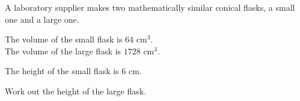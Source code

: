 \begin{question}
\noindent A laboratory supplier makes two mathematically similar conical flasks, a small one and a large one.

\noindent The volume of the small flask is $64 \text{ cm}^3$.\\
The volume of the large flask is $1728 \text{ cm}^3$.

\noindent The height of the small flask is $6$ cm.

\noindent Work out the height of the large flask.

\vspace{5cm}

\begin{flushright}
\end{flushright}
\end{question}
